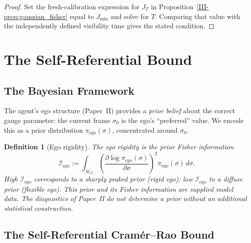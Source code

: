 \documentclass[12pt,a4paper,openany]{book}
\newtheorem{definition}[theorem]{Definition}
\begin{document}
\begin{proof}
Set the fresh-calibration expression for $J_T$ in
Proposition~\ref{III-prop:gaussian_fisher} equal to $J_{\min}$ and solve
for $T$.  Comparing that value with the independently defined
visibility time gives the stated condition.
\end{proof}

\section{The Self-Referential Bound}
\label{III-sec:SRCR}

\subsection{The Bayesian Framework}
\label{III-subsec:bayesian}

The agent's ego structure (Paper~II) provides a
\emph{prior belief} about the correct gauge parameter:
the current frame $\sigma_0$ is the ego's
``preferred'' value.
We encode this as a prior distribution
$\pi_{\mathrm{ego}}(\sigma)$, concentrated around
$\sigma_0$.

\begin{definition}[Ego rigidity]
\label{III-def:ego_rigidity}
The \emph{ego rigidity} is the prior Fisher information
\begin{equation}
\label{III-eq:ego_rigidity}
\mathcal{I}_{\mathrm{ego}}
:= \int_{\mathcal{M}_G}
\left(\frac{\partial \log \pi_{\mathrm{ego}}(\sigma)}
  {\partial \sigma}\right)^{\!2}
\pi_{\mathrm{ego}}(\sigma)\,d\sigma.
\end{equation}
High $\mathcal{I}_{\mathrm{ego}}$ corresponds to a
sharply peaked prior (rigid ego); low
$\mathcal{I}_{\mathrm{ego}}$ to a diffuse prior (flexible
ego).
This prior and its Fisher information are supplied model data.  The
diagnostics of Paper~II do not determine a prior without an additional
statistical construction.
\end{definition}

\subsection{The Self-Referential Cram\'{e}r--Rao Bound}
\label{III-subsec:SRCR}
\end{document}
